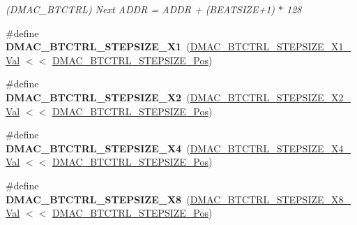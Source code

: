\begin{DoxyCompactItemize}
\begin{DoxyCompactList}\small\item\em (D\+M\+A\+C\+\_\+\+B\+T\+C\+T\+R\+L) Next A\+D\+D\+R = A\+D\+D\+R + (B\+E\+A\+T\+S\+I\+Z\+E+1) $\ast$ 128 \end{DoxyCompactList}\item 
\hypertarget{group___s_a_m_l21___d_m_a_c_gaefe5b83bcb65520cf0133410134c0613}{}\#define {\bfseries D\+M\+A\+C\+\_\+\+B\+T\+C\+T\+R\+L\+\_\+\+S\+T\+E\+P\+S\+I\+Z\+E\+\_\+\+X1}~(\hyperlink{group___s_a_m_l21___d_m_a_c_gaa089586d04726d1fe2a2b572764d51e3}{D\+M\+A\+C\+\_\+\+B\+T\+C\+T\+R\+L\+\_\+\+S\+T\+E\+P\+S\+I\+Z\+E\+\_\+\+X1\+\_\+\+Val}   $<$$<$ \hyperlink{group___s_a_m_l21___d_m_a_c_gacf7558693207543fbd9048f7f76fa238}{D\+M\+A\+C\+\_\+\+B\+T\+C\+T\+R\+L\+\_\+\+S\+T\+E\+P\+S\+I\+Z\+E\+\_\+\+Pos})\label{group___s_a_m_l21___d_m_a_c_gaefe5b83bcb65520cf0133410134c0613}

\item 
\hypertarget{group___s_a_m_l21___d_m_a_c_ga4aeaa926055e15b04116d1e0a41a56e1}{}\#define {\bfseries D\+M\+A\+C\+\_\+\+B\+T\+C\+T\+R\+L\+\_\+\+S\+T\+E\+P\+S\+I\+Z\+E\+\_\+\+X2}~(\hyperlink{group___s_a_m_l21___d_m_a_c_ga80329ffceb6b9a1a59101ebf1311e4df}{D\+M\+A\+C\+\_\+\+B\+T\+C\+T\+R\+L\+\_\+\+S\+T\+E\+P\+S\+I\+Z\+E\+\_\+\+X2\+\_\+\+Val}   $<$$<$ \hyperlink{group___s_a_m_l21___d_m_a_c_gacf7558693207543fbd9048f7f76fa238}{D\+M\+A\+C\+\_\+\+B\+T\+C\+T\+R\+L\+\_\+\+S\+T\+E\+P\+S\+I\+Z\+E\+\_\+\+Pos})\label{group___s_a_m_l21___d_m_a_c_ga4aeaa926055e15b04116d1e0a41a56e1}

\item 
\hypertarget{group___s_a_m_l21___d_m_a_c_gad4dd4fdb4ad63aac09b8996f4cc58db9}{}\#define {\bfseries D\+M\+A\+C\+\_\+\+B\+T\+C\+T\+R\+L\+\_\+\+S\+T\+E\+P\+S\+I\+Z\+E\+\_\+\+X4}~(\hyperlink{group___s_a_m_l21___d_m_a_c_ga0ec2b4b8e13fa2dcc7076d99e5b0ce36}{D\+M\+A\+C\+\_\+\+B\+T\+C\+T\+R\+L\+\_\+\+S\+T\+E\+P\+S\+I\+Z\+E\+\_\+\+X4\+\_\+\+Val}   $<$$<$ \hyperlink{group___s_a_m_l21___d_m_a_c_gacf7558693207543fbd9048f7f76fa238}{D\+M\+A\+C\+\_\+\+B\+T\+C\+T\+R\+L\+\_\+\+S\+T\+E\+P\+S\+I\+Z\+E\+\_\+\+Pos})\label{group___s_a_m_l21___d_m_a_c_gad4dd4fdb4ad63aac09b8996f4cc58db9}

\item 
\hypertarget{group___s_a_m_l21___d_m_a_c_gaf9c93c24a4d0ebd36cac925dfe49fcc2}{}\#define {\bfseries D\+M\+A\+C\+\_\+\+B\+T\+C\+T\+R\+L\+\_\+\+S\+T\+E\+P\+S\+I\+Z\+E\+\_\+\+X8}~(\hyperlink{group___s_a_m_l21___d_m_a_c_ga426419179c0a52bd86e40764396e365d}{D\+M\+A\+C\+\_\+\+B\+T\+C\+T\+R\+L\+\_\+\+S\+T\+E\+P\+S\+I\+Z\+E\+\_\+\+X8\+\_\+\+Val}   $<$$<$ \hyperlink{group___s_a_m_l21___d_m_a_c_gacf7558693207543fbd9048f7f76fa238}{D\+M\+A\+C\+\_\+\+B\+T\+C\+T\+R\+L\+\_\+\+S\+T\+E\+P\+S\+I\+Z\+E\+\_\+\+Pos})\label{group___s_a_m_l21___d_m_a_c_gaf9c93c24a4d0ebd36cac925dfe49fcc2}


\end{DoxyCompactItemize}
